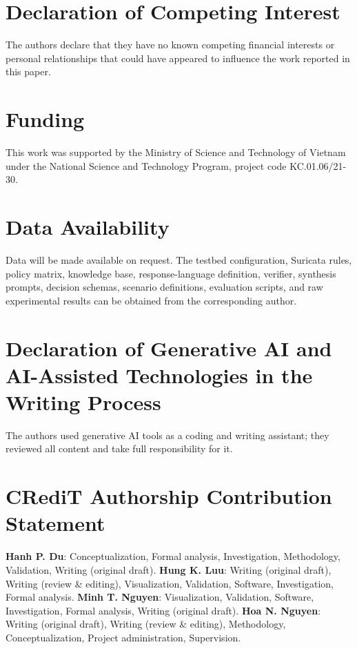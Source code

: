 \documentclass[final,5p]{elsarticle}
\begin{document}
\section*{Declaration of Competing Interest}
\noindent The authors declare that they have no known competing financial interests or personal relationships that could have appeared to influence the work reported in this paper.

\section*{Funding}
\noindent This work was supported by the Ministry of Science and Technology of Vietnam under the National Science and Technology Program, project code KC.01.06/21-30.

\section*{Data Availability}
\noindent Data will be made available on request. The testbed configuration, Suricata rules, policy matrix, knowledge base, response-language definition, verifier, synthesis prompts, decision schemas, scenario definitions, evaluation scripts, and raw experimental results can be obtained from the corresponding author.

\section*{Declaration of Generative AI and AI-Assisted Technologies in the Writing Process}
\noindent The authors used generative AI tools as a coding and writing assistant; they reviewed all content and take full responsibility for it.

\section*{CRediT Authorship Contribution Statement}
\noindent \textbf{Hanh P. Du}: Conceptualization, Formal analysis, Investigation, Methodology, Validation, Writing (original draft).
\textbf{Hung K. Luu}: Writing (original draft), Writing (review \& editing), Visualization, Validation, Software, Investigation, Formal analysis.
\textbf{Minh T. Nguyen}: Visualization, Validation, Software, Investigation, Formal analysis, Writing (original draft).
\textbf{Hoa N. Nguyen}: Writing (original draft), Writing (review \& editing), Methodology, Conceptualization, Project administration, Supervision.

\balance


\end{document}
